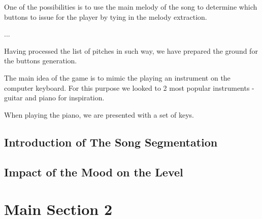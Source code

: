 One of the possibilities is to use the main melody of the song to determine which buttons to issue for the player by tying in the melody extraction.


...

Having processed the list of pitches in such way, we have prepared the ground for the buttons generation.

The main idea of the game is to mimic the playing an instrument on the computer keyboard. For this purpose we looked to 2 most popular instruments - guitar and piano for inspiration. 

When playing the piano, we are presented with a set of keys. 

\vspace{10pt}

\subsection{Introduction of The Song Segmentation}

\vspace{10pt}

\subsection{Impact of the Mood on the Level}

\vspace{20pt}


\section{Main Section 2}
